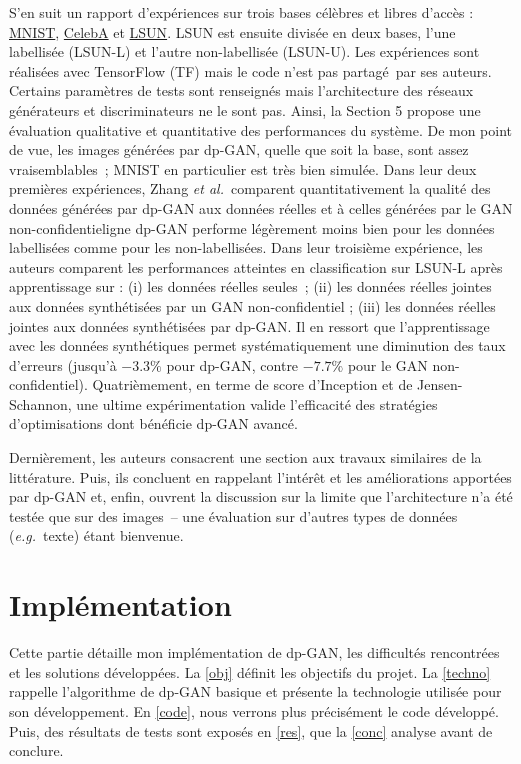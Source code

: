 \documentclass[a4paper,11pt,twoside]{article}
\theoremstyle{definition}
\newcommand{\eg}{\textit{e.g.}}
\newcommand{\etal}{\textit{et al.}}
\begin{document}
S'en suit un rapport d'expériences sur trois bases célèbres et libres d'accès : \href{http://yann.lecun.com/exdb/mnist/}{MNIST}, \href{http://mmlab.ie.cuhk.edu.hk/projects/CelebA.html}{CelebA} et \href{http://lsun.cs.princeton.edu/2015.html}{LSUN}. LSUN est ensuite divisée en deux bases, l'une labellisée (LSUN-L) et l'autre non-labellisée (LSUN-U). Les expériences sont réalisées avec TensorFlow (TF) mais le code n'est pas partagé par ses auteurs. Certains paramètres de tests sont renseignés mais l'architecture des réseaux générateurs et discriminateurs ne le sont pas. Ainsi, la Section 5 propose une évaluation qualitative et quantitative des performances du système. De mon point de vue, les images générées par dp-GAN, quelle que soit la base, sont assez vraisemblables ; MNIST en particulier est très bien simulée.
Dans leur deux premières expériences, Zhang \etal\ comparent quantitativement la qualité des données générées par dp-GAN aux données réelles et à celles générées par le GAN non-confidentieligne dp-GAN performe légèrement moins bien pour les données labellisées comme pour les non-labellisées. Dans leur troisième expérience, les auteurs comparent les performances atteintes en classification sur LSUN-L après apprentissage sur : (i) les données réelles seules ; (ii) les données réelles jointes aux données synthétisées par un GAN non-confidentiel ; (iii) les données réelles jointes aux données synthétisées par dp-GAN. Il en ressort que l'apprentissage avec les données synthétiques permet systématiquement une diminution des taux d'erreurs (jusqu'à $-3.3 \%$ pour dp-GAN, contre $-7.7 \%$ pour le GAN non-confidentiel). Quatrièmement, en terme de score d'Inception et de Jensen-Schannon, une ultime expérimentation valide l'efficacité des stratégies d'optimisations dont bénéficie dp-GAN avancé.

Dernièrement, les auteurs consacrent une section aux travaux similaires de la littérature. Puis, ils concluent en rappelant l'intérêt et les améliorations apportées par dp-GAN et, enfin, ouvrent la discussion sur la limite que l'architecture n'a été testée que sur des images -- une évaluation sur d'autres types de données (\eg\ texte) étant bienvenue.

\part{Implémentation}
\label{impl}

Cette partie détaille mon implémentation de dp-GAN, les difficultés rencontrées et les solutions développées. La \autoref{obj} définit les objectifs du projet. La \autoref{techno} rappelle l'algorithme de dp-GAN basique et présente la technologie utilisée pour son développement. En \autoref{code}, nous verrons plus précisément le code développé. Puis, des résultats de tests sont exposés en \autoref{res}, que la \autoref{conc} analyse avant de conclure.
\end{document}

